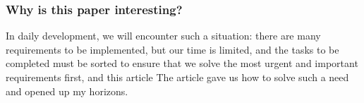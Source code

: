 \documentclass[UTF8]{IEEEtran}
\begin{document}
\subsubsection{Why is this paper interesting?}
In daily development, we will encounter such a situation: there are many requirements to be implemented, but our time is limited, and the tasks to be completed must be sorted to ensure that we solve the most urgent and important requirements first, and this article The article gave us how to solve such a need and opened up my horizons.


\end{document}
